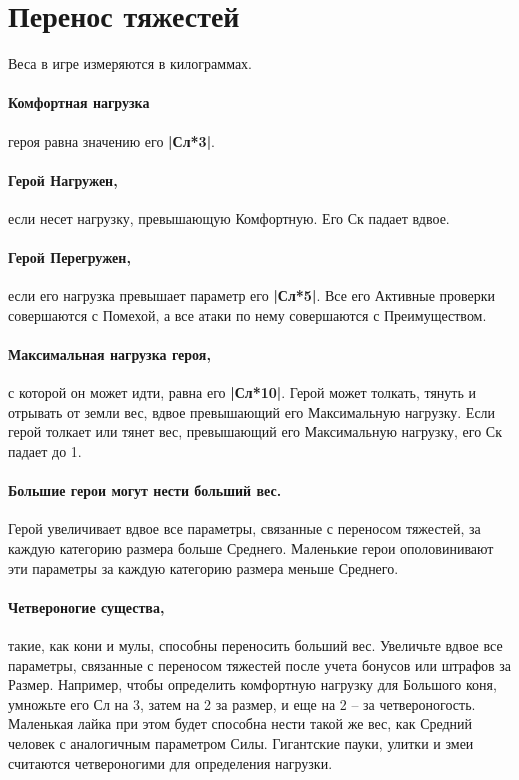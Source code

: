 \section{Перенос тяжестей}
Веса в игре измеряются в килограммах.
\paragraph{Комфортная нагрузка} героя равна значению его \textbf{|Сл*3|}. 
\paragraph{Герой Нагружен,} если несет нагрузку, превышающую Комфортную. Его Ск падает вдвое. 
\paragraph{Герой Перегружен,} если его нагрузка превышает параметр его \textbf{|Сл*5|}. Все его Активные проверки совершаются с Помехой, а все атаки по нему совершаются с Преимуществом. 
\paragraph{Максимальная нагрузка героя,} с которой он может идти, равна его \textbf{|Сл*10|}.
\newline Герой может толкать, тянуть и отрывать от земли вес, вдвое превышающий его Максимальную нагрузку. Если герой толкает или тянет вес, превышающий его Максимальную нагрузку, его Ск падает до 1. 
\paragraph{Большие герои могут нести больший вес.} Герой увеличивает вдвое все параметры, связанные с переносом тяжестей, за каждую категорию размера больше Среднего. Маленькие герои ополовинивают эти параметры за каждую категорию размера меньше Среднего.
\paragraph{Четвероногие существа,} такие, как кони и мулы, способны переносить больший вес. Увеличьте вдвое все параметры, связанные с переносом тяжестей после учета бонусов или штрафов за Размер. 
\newline Например, чтобы определить комфортную нагрузку для Большого коня, умножьте его Сл на 3, затем на 2 за размер, и еще на 2 – за четвероногость. Маленькая лайка при этом будет способна нести такой же вес, как Средний человек с аналогичным параметром Силы. Гигантские пауки, улитки и змеи считаются четвероногими для определения нагрузки.


